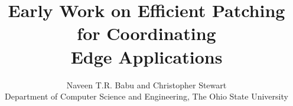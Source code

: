 \documentclass[10pt,twocolumn]{article}
\title{Early Work on Efficient Patching for Coordinating \\
Edge Applications 
}
\author{ \large
    Naveen T.R. Babu and Christopher Stewart\\
         Department of Computer Science and  Engineering, The Ohio State University\\
}
\begin{document}

\date{}
\maketitle
\thispagestyle{empty}
\pagestyle{empty}


\begin{abstract}

\end{abstract} 






%











{\small


}
\end{document}
